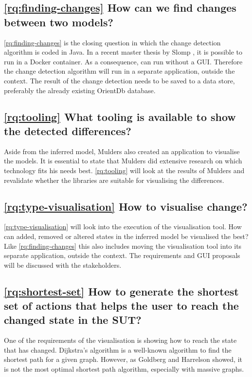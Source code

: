 \subsection{\ref{rq:finding-changes} How can we find changes between two models?}
\ref{rq:finding-changes} is the closing question in which the change detection algorithm is coded in Java. In a recent master thesis by Slomp \cite{thesisSlomp}, it is possible to run \testar in a Docker container. As a consequence, \testar can run without a GUI. Therefore the change detection algorithm will run in a separate application, outside the \testar context. The result of the change detection needs to be saved to a data store, preferably the already existing OrientDb database. 

\subsection{\ref{rq:tooling} What tooling is available to show the detected differences?}
Aside from the inferred model, Mulders also created an application to visualise the models. It is essential to state that Mulders did extensive research on which technology fits his needs best. \ref{rq:tooling} will look at the results of Mulders and revalidate whether the libraries are suitable for visualising the differences. 

\subsection{\ref{rq:type-visualisation} How to visualise change?}
\ref{rq:type-visualisation} will look into the execution of the visualisation tool. How can added, removed or altered states in the inferred model be visualised the best? Like \ref{rq:finding-changes} this also includes moving the visualisation tool into its separate application, outside the \testar context. The requirements and GUI proposals will be discussed with the \testar stakeholders. 

\subsection{\ref{rq:shortest-set} How to generate the shortest set of actions that helps the user to reach the changed state in the SUT?}
One of the requirements of the visualisation is showing how to reach the state that has changed. Dijkstra's algorithm \cite{dijkstra1959note} is a well-known algorithm to find the shortest path for a given graph. However, as Goldberg and Harrelson \cite{goldberg2005computing} showed, it is not the most optimal shortest path algorithm, especially with massive graphs. 

